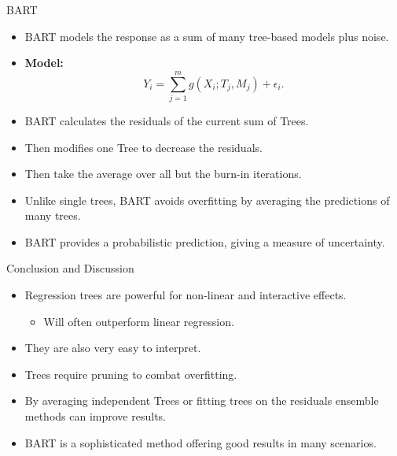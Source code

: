 \documentclass[10pt]{beamer}
\begin{document}
\begin{frame}{BART}
    \begin{itemize}
        \item BART models the response as a sum of many tree-based models plus noise.
        \item \textbf{Model:}
        \begin{equation}
            Y_i = \sum_{j=1}^{m} g(X_i; T_j, M_j) + \epsilon_i.
        \end{equation}
        \item BART calculates the residuals of the current sum of Trees.
        \item Then modifies one Tree to decrease the residuals.
        \item Then take the average over all but the burn-in iterations.
        \item Unlike single trees, BART avoids overfitting by averaging the predictions of many trees.
        \item BART provides a probabilistic prediction, giving a measure of uncertainty.
    \end{itemize}
\end{frame}


\begin{frame}{Conclusion and Discussion}
    \begin{itemize}
        \item Regression trees are powerful for non-linear and interactive effects.
        \begin{itemize}
            \item Will often outperform linear regression.
        \end{itemize}
        \item They are also very easy to interpret.
        \item Trees require pruning to combat overfitting.
        \item By averaging independent Trees or fitting trees on the residuals ensemble methods can improve results.
        \item BART is a sophisticated method offering good results in many scenarios.
    \end{itemize}
\end{frame}
\end{document}
